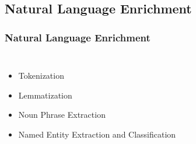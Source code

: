 \documentclass[red]{beamer}
\begin{document}
\subsection{Natural Language Enrichment}
\begin{frame}
    \frametitle{Natural Language Enrichment}
    \begin{columns}
            \begin{itemize}
                \item
                    Tokenization
                \item
                    Lemmatization
                \item
                    Noun Phrase Extraction
                \item
                    Named Entity Extraction and Classification
            \end{itemize}
        \begin{figure}

\end{figure}
\end{columns}
\end{frame}
\end{document}
